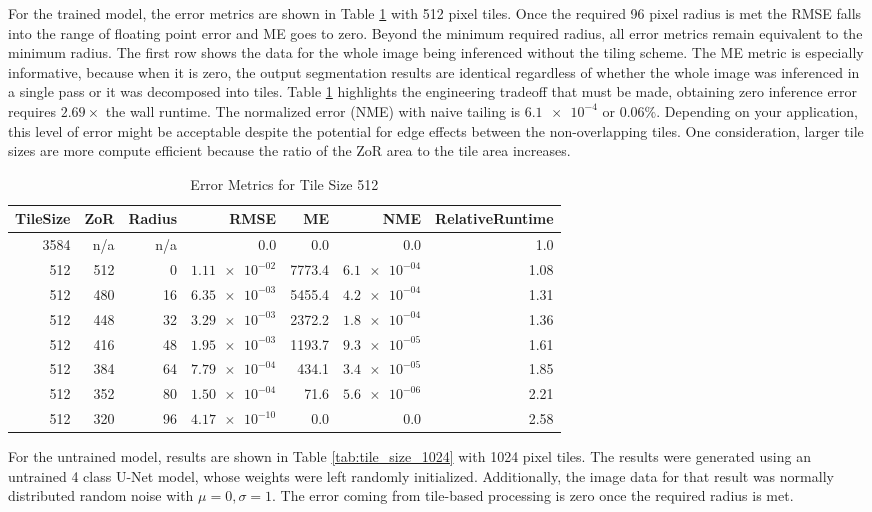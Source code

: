 \documentclass[runningheads]{llncs}
\begin{document}
For the trained model, the error metrics are shown in Table \ref{tab:tile_size_512} with 512 pixel tiles. Once the required 96 pixel radius is met the RMSE falls into the range of floating point error and ME goes to zero. Beyond the minimum required radius, all error metrics remain equivalent to the minimum radius. The first row shows the data for the whole image being inferenced without the tiling scheme. 
The ME metric is especially informative, because when it is zero, the output segmentation results are identical regardless of whether the whole image was inferenced in a single pass or it was decomposed into tiles. Table \ref{tab:tile_size_512} highlights the engineering tradeoff that must be made, obtaining zero inference error requires $2.69 \times$ the wall runtime. The normalized error (NME) with naive tailing is $\num{6.1e-4}$ or $\num{0.06} \%$. Depending on your application, this level of error might be acceptable despite the potential for edge effects between the non-overlapping tiles. One consideration, larger tile sizes are more compute efficient because the ratio of the ZoR area to the tile area increases.

\begin{table}[h!]
	\centering
\caption{Error Metrics for Tile Size 512}
\label{tab:tile_size_512}
\begin{tabular}{r|r|r|r|r|r|r}
	TileSize & ZoR & Radius & RMSE    & ME & NME & RelativeRuntime \\ 
	\hline
3584 & n/a & n/a & 0.0 & 0.0 & 0.0 & 1.0 \\
512 & 512 & 0 & $\num{1.11e-02}$ & 7773.4 & $\num{6.1e-04}$ & 1.08 \\
512 & 480 & 16 & $\num{6.35e-03}$ & 5455.4 & $\num{4.2e-04}$ & 1.31 \\
512 & 448 & 32 & $\num{3.29e-03}$ & 2372.2 & $\num{1.8e-04}$ & 1.36 \\
512 & 416 & 48 & $\num{1.95e-03}$ & 1193.7 & $\num{9.3e-05}$ & 1.61 \\
512 & 384 & 64 & $\num{7.79e-04}$ & 434.1 & $\num{3.4e-05}$ & 1.85 \\
512 & 352 & 80 & $\num{1.50e-04}$ & 71.6 & $\num{5.6e-06}$ & 2.21 \\
512 & 320 & 96 & $\num{4.17e-10}$ & 0.0 & 0.0 & 2.58 \\
\end{tabular}
\end{table}

For the untrained model, results are shown in Table \ref{tab:tile_size_1024} with 1024 pixel tiles. The results were generated using an untrained 4 class U-Net model, whose weights were left randomly initialized. Additionally, the image data for that result was normally distributed random noise with $\mu = 0, \sigma = 1$. The error coming from tile-based processing is zero once the required radius is met.
\end{document}
